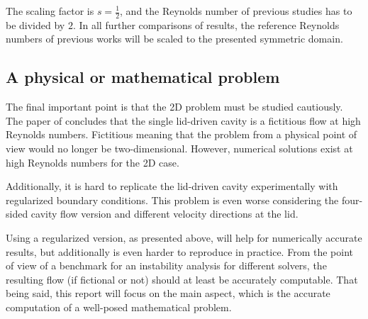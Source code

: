 The scaling factor is $s=\frac{1}{2}$, and the Reynolds number of previous
studies has to be divided by $2$. In all further comparisons of results, the
reference Reynolds numbers of previous works will be scaled to the presented
symmetric domain.


\subsection{A physical or mathematical problem}

The final important point is that the 2D problem must be studied cautiously.
The paper of \cite{eturk2009} concludes that the single lid-driven cavity is a
fictitious flow at high Reynolds numbers. Fictitious meaning that the problem
from a physical point of view would no longer be two-dimensional. However,
numerical solutions exist at high Reynolds numbers for the 2D case. 

Additionally, it is hard to replicate the lid-driven cavity experimentally with
regularized boundary conditions. This problem is even worse considering the
four-sided cavity flow version and different velocity directions at the lid.

Using a regularized version, as presented above, will help for numerically
accurate results, but additionally is even harder to reproduce in practice.
From the point of view of a benchmark for an instability analysis for different
solvers, the resulting flow (if fictional or not) should at least be accurately
computable. That being said, this report will focus on the main aspect, which
is the accurate computation of a well-posed mathematical problem. 
